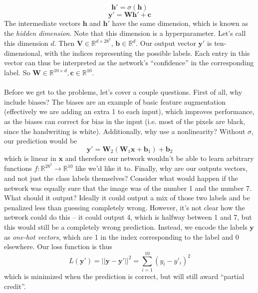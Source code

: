 \documentclass{article}
\begin{document}
$$\mathbf{h'} = \sigma(\mathbf{h})$$
$$\mathbf{y}' = \mathbf{Wh'} + \mathbf{c}$$
The intermediate vectors $\mathbf{h}$ and $\mathbf{h'}$ have the same dimension, which is known as the \textit{hidden dimension}. Note that this dimension is a hyperparameter. Let's call this dimension $d$. Then $\mathbf{V} \in \mathbb{R}^{d \times 28^2}$, $\mathbf{b} \in \mathbb{R}^d$. Our output vector $\mathbf{y}'$ is ten-dimensional, with the indices representing the possible labels. Each entry in this vector can thus be interpreted as the network's ``confidence'' in the corresponding label. So $\mathbf{W} \in \mathbb{R}^{10 \times d}, \mathbf{c} \in \mathbb{R}^{10}$. \\\\
Before we get to the problems, let's cover a couple questions. First of all, why include biases? The biases are an example of basic feature augmentation (effectively we are adding an extra 1 to each input), which improves performance, as the biases can correct for bias in the input (i.e. most of the pixels are black, since the handwriting is white). Additionally, why use a nonlinearity? Without $\sigma$, our prediction would be $$\mathbf{y}' = \mathbf{W}_2(\mathbf{W}_1\mathbf{x} + \mathbf{b}_1) + \mathbf{b}_2$$ which is linear in $\mathbf{x}$ and therefore our network wouldn't be able to learn arbitrary functions $f: \mathbb{R}^{28^2} \rightarrow \mathbb{R}^{10}$ like we'd like it to. Finally, why are our outputs vectors, and not just the class labels themselves? Consider what would happen if the network was equally sure that the image was of the number 1 and the number 7. What should it output? Ideally it could output a mix of those two labels and be penalized less than guessing completely wrong. However, it's not clear how the network could do this -- it could output 4, which is halfway between 1 and 7, but this would still be a completely wrong prediction. Instead, we encode the labels $\mathbf{y}$ as \textit{one-hot vectors}, which are 1 in the index corresponding to the label and 0 elsewhere. Our loss function is thus $$L(\mathbf{y}') = || \mathbf{y} - \mathbf{y}'||^2 = \sum_{i=1}^{10}(y_i - y'_i)^2$$ which is minimized when the prediction is correct, but will still award ``partial credit''.
\end{document}
